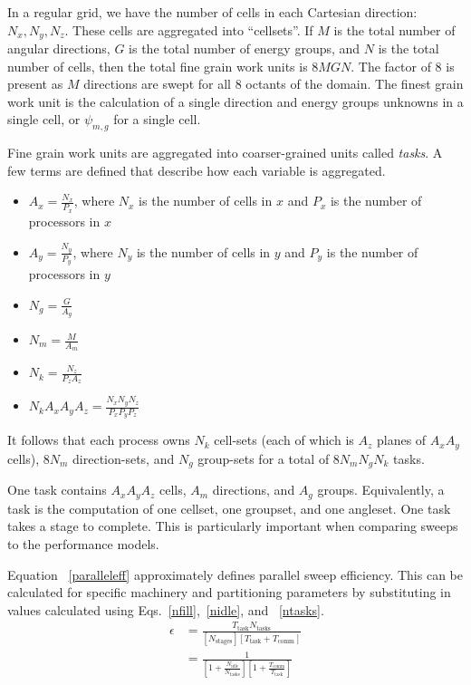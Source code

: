 \documentclass{anstrans}
\begin{document}
In a regular grid, we have the  number of cells in each Cartesian direction: $N_x, N_y, N_z$. These cells are aggregated into ``cellsets''. If $M$ is the total number of angular directions, $G$ is the total number of energy groups, and $N$ is the total number of cells, then the total fine grain work units is $8MGN$. The factor of 8 is present as $M$ directions are swept for all 8 octants of the domain. The finest grain work unit is the calculation of a single direction and energy groups unknowns in a single cell, or $\psi_{m,g}$ for a single cell.

Fine grain work units are aggregated into coarser-grained units called \textit{tasks}. A few terms are defined that describe how each variable is aggregated.
\begin{itemize}
\item $A_x = \frac{N_x}{P_x}$, where $N_x$ is the number of cells in $x$ and $P_x$ is the number of processors in $x$
\item $A_y = \frac{N_y}{P_y}$, where $N_y$ is the number of cells in $y$ and $P_y$ is the number of processors in $y$
\item $N_g = \frac{G}{A_g}$
\item $N_m = \frac{M}{A_m}$
\item $N_k = \frac{N_z}{P_z A_z}$
\item $N_k A_x A_y A_z = \frac{N_x N_y N_z}{P_x P_y P_z}$
\end{itemize}

It follows that each process owns $N_k$ cell-sets (each of which is $A_z$ planes of $A_x A_y$ cells), $8N_m$ direction-sets, and $N_g$ group-sets for a total of $8N_m N_g N_k$ tasks.

One task contains $A_x A_y A_z$ cells, $A_m$ directions, and $A_g$ groups. Equivalently, a task is the computation of one cellset, one groupset, and one angleset. One task takes a stage to complete.  This is particularly important when comparing sweeps to the performance models. 

Equation ~\eqref{paralleleff} approximately defines parallel sweep efficiency. This can be calculated for specific machinery and partitioning parameters by substituting in values calculated using Eqs.~\eqref{nfill},~\eqref{nidle}, and ~\eqref{ntasks}.
\begin{equation}\label{paralleleff}
\begin{split}
\epsilon &= \frac{T_{\text{task}} N_{\text{tasks}}}{[N_{\text{stages}}] [T_{\text{task}} + T_{\text{comm}}]} \\
            &=\frac{1}{[1+\frac{N_{\text{idle}}}{N_{\text{tasks}}}][1 + \frac{T_{\text{comm}}}{T_{\text{task}}}]}
\end{split}
\end{equation}
\end{document}
